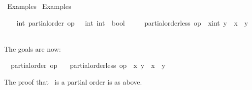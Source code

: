 %
\begin{isabellebody}%
\def\isabellecontext{Examples{\isadigit{2}}}%
%
\isadelimtheory
%
\endisadelimtheory
%
\isatagtheory
{}\isamarkupfalse%
\ Examples{}\isanewline
{}\ Examples\isanewline
{}%
\endisatagtheory
{\isafoldtheory}%
%
\isadelimtheory
%
\endisadelimtheory
%
\begin{isamarkuptext}%
\vspace{-5ex}%
\end{isamarkuptext}%
\isamarkuptrue%
%
\isadelimvisible
\ \ %
\endisadelimvisible
%
\isatagvisible
{}\isamarkupfalse%
\ int{}\ partial{}order\ {}op\ {}\ {}{}\ {}int{}\ int{}\ {}\ bool{}\isanewline
\ \ \ \ \ {}partial{}order{}less\ op\ {}\ {}x{}{}int{}\ y\ {}\ {}x\ {}\ y{}{}\isanewline
\ \ \isamarkupfalse%
\ {}%
\begin{isamarkuptxt}%
\normalsize The goals are now:
      \begin{isabelle}%
\ {}{}\ partial{}order\ op\ {}\isanewline
\ {}{}\ partial{}order{}less\ op\ {}\ x\ y\ {}\ {}x\ {}\ y{}%
\end{isabelle}
      The proof that~ is a partial order is as above.%
\end{isamarkuptxt}%

\end{isabellebody}
